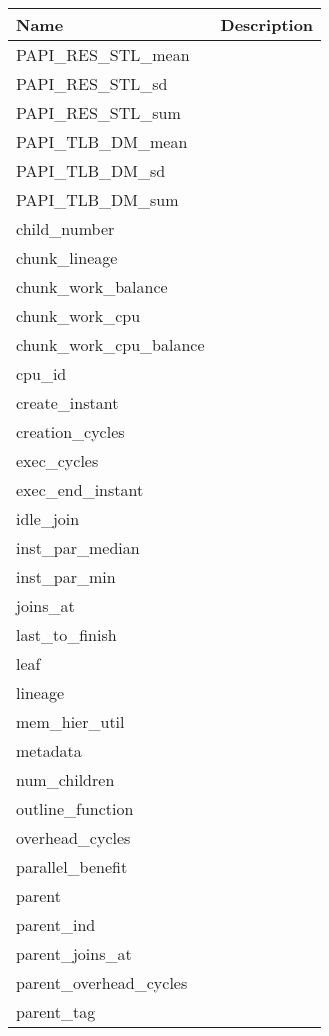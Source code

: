 \documentclass[11pt,a4paper]{article}
\begin{document}
\begin{appendices}
\begin{longtable}{|l|l|}
    \hline
    \textbf{Name} & \textbf{Description} \\ \hline
    PAPI\_RES\_STL\_mean & \\ \hline
    PAPI\_RES\_STL\_sd & \\ \hline
    PAPI\_RES\_STL\_sum & \\ \hline
    PAPI\_TLB\_DM\_mean & \\ \hline
    PAPI\_TLB\_DM\_sd & \\ \hline
    PAPI\_TLB\_DM\_sum & \\ \hline
    child\_number & \\ \hline
    chunk\_lineage & \\ \hline
    chunk\_work\_balance & \\ \hline
    chunk\_work\_cpu & \\ \hline
    chunk\_work\_cpu\_balance & \\ \hline
    cpu\_id & \\ \hline
    create\_instant & \\ \hline
    creation\_cycles & \\ \hline
    exec\_cycles & \\ \hline
    exec\_end\_instant & \\ \hline
    idle\_join & \\ \hline
    inst\_par\_median & \\ \hline
    inst\_par\_min & \\ \hline
    joins\_at & \\ \hline
    last\_to\_finish & \\ \hline
    leaf & \\ \hline
    lineage & \\ \hline
    mem\_hier\_util & \\ \hline
    metadata & \\ \hline
    num\_children & \\ \hline
    outline\_function & \\ \hline
    overhead\_cycles & \\ \hline
    parallel\_benefit & \\ \hline
    parent & \\ \hline
    parent\_ind & \\ \hline
    parent\_joins\_at & \\ \hline
    parent\_overhead\_cycles & \\ \hline
    parent\_tag & \\ \hline

\end{longtable}
\end{appendices}
\end{document}
